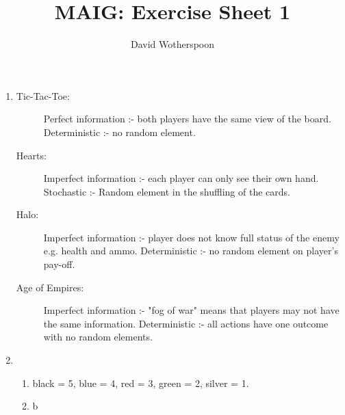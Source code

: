 \documentclass[a4paper]{article}
\title{MAIG: Exercise Sheet 1}
\author{David Wotherspoon}
\date{}
\begin{document}
\maketitle
\begin{enumerate}
	\item
		\begin{description}
			\item[Tic-Tac-Toe:] Perfect information :- both players have the same view of the board. Deterministic :- no random element.
			\item[Hearts:] Imperfect information :- each player can only see their own hand. Stochastic :- Random element in the shuffling of the cards.
			\item[Halo:] Imperfect information :- player does not know full status of the enemy e.g. health and ammo. Deterministic :- no random element on player's pay-off.
			\item[Age of Empires:] Imperfect information :- "fog of war" means that players may not have the same information. Deterministic :- all actions have one outcome with no random elements.
		\end{description}
	\item
		\begin{enumerate}
		\item black = 5, blue = 4, red = 3, green = 2, silver = 1.
		\item b
		\end{enumerate}
\end{enumerate}
\end{document}
